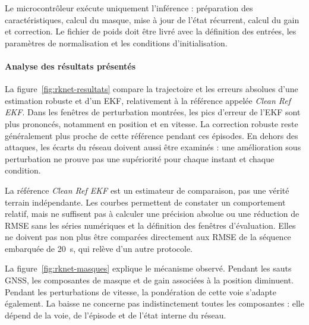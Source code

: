  Le microcontrôleur exécute uniquement l'inférence : préparation des caractéristiques, calcul du masque, mise à jour de l'état récurrent, calcul du gain et correction. Le fichier de poids doit être livré avec la définition des entrées, les paramètres de normalisation et les conditions d'initialisation.

\paragraph{Analyse des résultats présentés}
La figure~\ref{fig:rknet-resultats} compare la trajectoire et les erreurs absolues d'une estimation robuste et d'un EKF, relativement à la référence appelée \emph{Clean Ref EKF}. Dans les fenêtres de perturbation montrées, les pics d'erreur de l'EKF sont plus prononcés, notamment en position et en vitesse. La correction robuste reste généralement plus proche de cette référence pendant ces épisodes. En dehors des attaques, les écarts du réseau doivent aussi être examinés : une amélioration sous perturbation ne prouve pas une supériorité pour chaque instant et chaque condition.


La référence \emph{Clean Ref EKF} est un estimateur de comparaison, pas une vérité terrain indépendante. Les courbes permettent de constater un comportement relatif, mais ne suffisent pas à calculer une précision absolue ou une réduction de RMSE sans les séries numériques et la définition des fenêtres d'évaluation. Elles ne doivent pas non plus être comparées directement aux RMSE de la séquence embarquée de 20~s, qui relève d'un autre protocole.

La figure~\ref{fig:rknet-masques} explique le mécanisme observé. Pendant les sauts GNSS, les composantes de masque et de gain associées à la position diminuent. Pendant les perturbations de vitesse, la pondération de cette voie s'adapte également. La baisse ne concerne pas indistinctement toutes les composantes : elle dépend de la voie, de l'épisode et de l'état interne du réseau. 

\FloatBarrier

